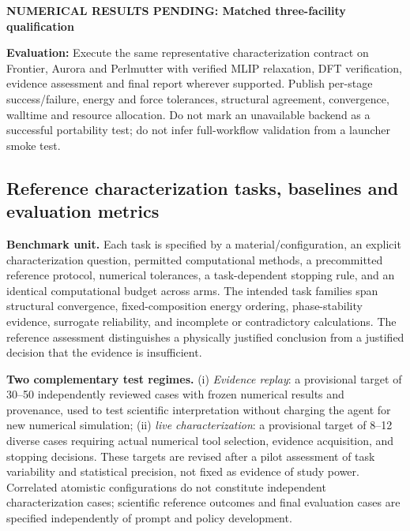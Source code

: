 \documentclass[11pt,a4paper]{article}
\newcommand{\newexperiment}[2]{\par\medskip\noindent\begingroup\color{red!80!black}\textbf{NUMERICAL RESULTS PENDING: #1}\par\noindent\textbf{Evaluation:} #2\par\endgroup\medskip}
\begin{document}
\newexperiment{Matched three-facility qualification}{Execute the same representative characterization contract on Frontier, Aurora and Perlmutter with verified MLIP relaxation, DFT verification, evidence assessment and final report wherever supported. Publish per-stage success/failure, energy and force tolerances, structural agreement, convergence, walltime and resource allocation. Do not mark an unavailable backend as a successful portability test; do not infer full-workflow validation from a launcher smoke test.}


\subsection{Reference characterization tasks, baselines and evaluation metrics}
\label{sec:results_protocol}
\noindent\textbf{Benchmark unit.} Each task is specified by a material/configuration, an explicit characterization question, permitted computational methods, a precommitted reference protocol, numerical tolerances, a task-dependent stopping rule, and an identical computational budget across arms. The intended task families span structural convergence, fixed-composition energy ordering, phase-stability evidence, surrogate reliability, and incomplete or contradictory calculations. The reference assessment distinguishes a physically justified conclusion from a justified decision that the evidence is insufficient.

\noindent\textbf{Two complementary test regimes.} (i) \emph{Evidence replay}: a provisional target of 30--50 independently reviewed cases with frozen numerical results and provenance, used to test scientific interpretation without charging the agent for new numerical simulation; (ii) \emph{live characterization}: a provisional target of 8--12 diverse cases requiring actual numerical tool selection, evidence acquisition, and stopping decisions. These targets are revised after a pilot assessment of task variability and statistical precision, not fixed as evidence of study power. Correlated atomistic configurations do not constitute independent characterization cases; scientific reference outcomes and final evaluation cases are specified independently of prompt and policy development.
\end{document}
